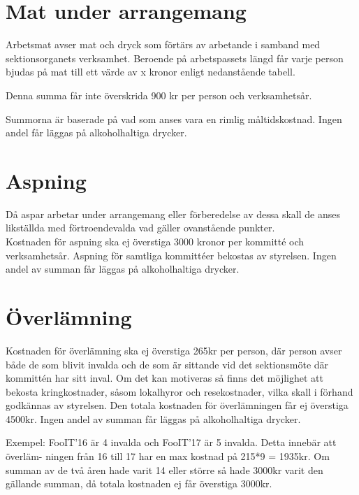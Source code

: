 \documentclass[11pt, includeaddress]{classes/cthit}
\begin{document}
\section{Mat under arrangemang}
Arbetsmat avser mat och dryck som förtärs av arbetande i samband med sektionsorganets verksamhet. 
Beroende på arbetspassets längd får varje person bjudas på mat till ett värde av x kronor enligt nedanstående tabell.

\addvbuffer[\the\baselineskip]{\begin{tabular}{ l  c  c  c}
	\centering
	Timmar & [0-3] & (3-6] & (6-$\infty$) \\
	\hline
	Kronor & 0 & 75 & 150 \\
\end{tabular}}

    Denna summa får inte överskrida 900 kr per person och verksamhetsår.

    Summorna är baserade på vad som anses vara en rimlig
    måltidskostnad. Ingen andel får läggas på alkoholhaltiga drycker.

\section{Aspning}
Då aspar arbetar under arrangemang eller förberedelse av dessa skall de anses likställda med förtroendevalda vad gäller ovanstående punkter. \\

Kostnaden för aspning ska ej överstiga 3000 kronor per kommitté och verksamhetsår.
Aspning för samtliga kommittéer bekostas av styrelsen. Ingen andel av summan får läggas på alkoholhaltiga drycker.

\section{Överlämning}
Kostnaden för överlämning ska ej överstiga 265kr per person, där person avser både de som blivit invalda och de som är sittande vid det sektionsmöte där kommittén har sitt inval. Om det kan motiveras så finns det möjlighet att bekosta kringkostnader, såsom lokalhyror och resekostnader, vilka skall i förhand godkännas av styrelsen. Den totala kostnaden för överlämningen får ej överstiga 4500kr. Ingen andel av summan får läggas på alkoholhaltiga drycker.

Exempel: FooIT’16 är 4 invalda och FooIT’17 är 5 invalda. Detta innebär att överläm- ningen från 16 till 17 har en max kostnad på 215*9 = 1935kr. Om summan av de två åren hade varit 14 eller större så hade 3000kr varit den gällande summan, då totala kostnaden ej får överstiga 3000kr.
\end{document}
